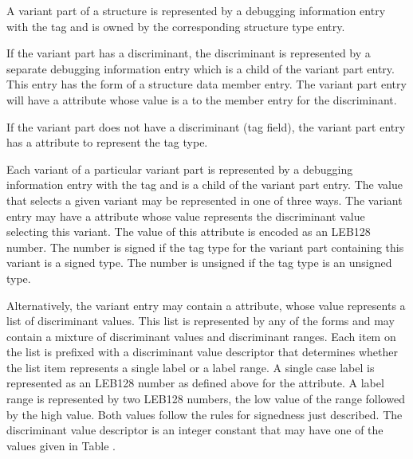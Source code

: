 A variant part of a structure is represented by a debugging
information entry with the 
tag \DWTAGvariantpartTARG{} and is
owned by the corresponding structure type entry.

If the variant part has a discriminant, the discriminant 
is\hypertarget{chap:DWATdiscrdiscriminantofvariantpart}{}
represented by a 
separate debugging information entry which
is a child of the variant part entry. This entry has the form
of a 
structure data member entry. The variant part entry will
have a 
\DWATdiscrDEFN{} attribute 
whose value is a  to
the member entry for the discriminant.

If the variant part does not have a discriminant (tag field),
the variant part entry has 
a \DWATtype{} attribute to represent
the tag type.

Each variant of a particular variant part is represented 
by\hypertarget{chap:DWATdiscrvaluediscriminantvalue}{}
a debugging information entry with the 
tag \DWTAGvariantTARG{}
and is a child of the variant part entry. The value that
selects a given variant may be represented in one of three
ways. The variant entry may have a \DWATdiscrvalueDEFN{} 
attribute
whose value represents the discriminant value selecting 
this variant. The value of this
attribute is encoded as an LEB128 number. The number is signed
if the tag type for the variant part containing this variant
is a signed type. The number is unsigned if the tag type is
an unsigned type.

Alternatively,\hypertarget{chap:DWATdiscrlistlistofdiscriminantvalues}{}
the variant entry may contain a
\DWATdiscrlistDEFN{}
attribute, whose value represents a list of discriminant
values. This list is represented by any of the 
 forms and may contain a 
mixture of discriminant values and discriminant ranges. 
Each item on the list is prefixed with a discriminant value
descriptor that determines whether the list item represents
a single label or a label range. A single case label is
represented as an LEB128 number as defined above for the
\DWATdiscrvalue{} 
attribute. A label range is represented by
two LEB128 numbers, the low value of the range followed by the
high value. Both values follow the rules for signedness just
described. The discriminant value descriptor is an integer
constant that may have one of the values given in 
Table .

